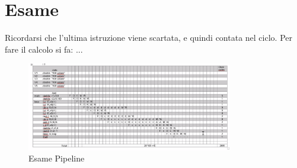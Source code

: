 \documentclass[12pt]{article}
\begin{document}
\newpage
\section{Esame}
Ricordarsi che l'ultima istruzione viene scartata, e quindi contata nel ciclo. Per fare il calcolo si fa: ...
\begin{figure}[H]
    \centering
    \includegraphics[width=0.8\textwidth]{esame-pipeline.png}
    \caption{Esame Pipeline}
    \label{fig:esame-pipeline}
\end{figure}
\end{document}

